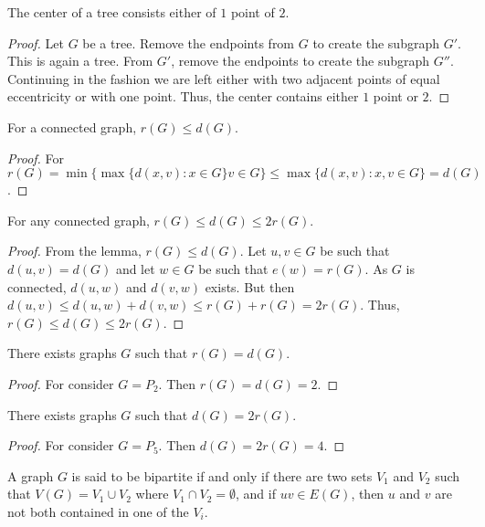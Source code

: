         \begin{theorem}
        The center of a tree consists either of $1$ point of $2$.
        \end{theorem}
        \begin{proof}
        Let $G$ be a tree. Remove the endpoints from $G$ to create the subgraph $G'$. This is again a tree. From $G'$, remove the endpoints to create the subgraph $G''$. Continuing in the fashion we are left either with two adjacent points of equal eccentricity or with one point. Thus, the center contains either $1$ point or $2$.
        \end{proof}
        \begin{theorem}
        For a connected graph, $r(G) \leq d(G)$.
        \end{theorem}
        \begin{proof}
        For $r(G) = \min\{\max\{d(x,v):x\in G\} v\in G\} \leq \max\{d(x,v):x,v\in G\}=d(G)$.
        \end{proof}
        \begin{theorem}
        For any connected graph, $r(G) \leq d(G) \leq 2r(G)$.
        \end{theorem}
        \begin{proof}
        From the lemma, $r(G) \leq d(G)$. Let $u,v\in G$ be such that $d(u,v)=d(G)$ and let $w\in G$ be such that $e(w) = r(G)$. As $G$ is connected, $d(u,w)$ and $d(v,w)$ exists. But then $d(u,v)\leq d(u,w)+d(v,w) \leq r(G)+r(G)=2r(G)$. Thus, $r(G)\leq d(G)\leq 2r(G)$.
        \end{proof}
        \begin{theorem}
        There exists graphs $G$ such that $r(G) = d(G)$.
        \end{theorem}
        \begin{proof}
        For consider $G=P_2$. Then $r(G) = d(G) = 2$.
        \end{proof}
        \begin{theorem}
        There exists graphs $G$ such that $d(G) = 2r(G)$.
        \end{theorem}
        \begin{proof}
        For consider $G=P_5$. Then $d(G) = 2r(G) = 4$.
        \end{proof}
        \begin{definition}
        A graph $G$ is said to be bipartite if and only if there are two sets $V_1$ and $V_2$ such that $V(G) = V_1\cup V_2$ where $V_1\cap V_2 = \emptyset$, and if $uv \in E(G)$, then $u$ and $v$ are not both contained in one of the $V_i$.
        \end{definition}
